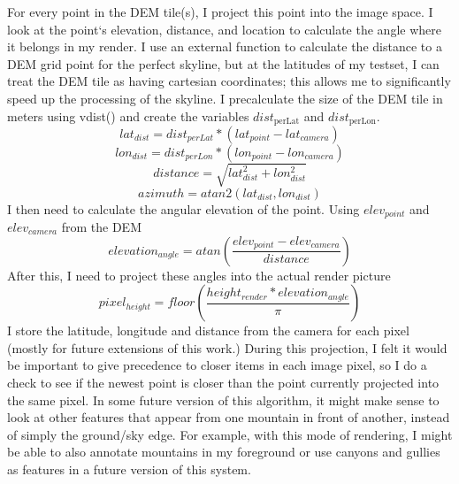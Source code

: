 \documentclass{acm_proc_article-sp}
\begin{document}
For every point in the DEM tile(s), I project this point into the image space.  I look at the point`s elevation, distance, and location to calculate the angle where it belongs in my render.  I use an external function \cite{vdist} to calculate the distance to a DEM grid point for the perfect skyline, but at the latitudes of my testset, I can treat the DEM tile as having cartesian coordinates; this allows me to significantly speed up the processing of the skyline\cite{behringer2002registration}.  I precalculate the size of the DEM tile in meters using vdist()\cite{vdist} and create the variables $dist_{\textrm{perLat}}$ and $dist_{\textrm{perLon}}$.
\begin{equation}
	lat_{dist} = dist_{perLat} * (lat_{point} - lat_{camera})
\label{eq:az1}
\end{equation}
\begin{equation}
	lon_{dist} = dist_{perLon} * (lon_{point} - lon_{camera})
\end{equation}
\begin{equation}
	distance = \sqrt{lat_{dist}^2 + lon_{dist}^2}
\end{equation}
\begin{equation}
	azimuth = atan2(lat_{dist}, lon_{dist})
\label{eq:azend}
\end{equation}
I then need to calculate the angular elevation of the point. Using $elev_{point}$ and $elev_{camera}$ from the DEM
\begin{equation}
	elevation_{angle} = atan(\frac{elev_{point} - elev_{camera}}{distance})
\end{equation}
After this, I need to project these angles into the actual render picture
\begin{equation}
	pixel_{height} = floor(\frac{height_{render} * elevation_{angle}}{\pi})
\end{equation}
I store the latitude, longitude and distance from the camera for each pixel (mostly for future extensions of this work.) During this projection, I felt it would be important to give precedence to closer items in each image pixel, so I do a check to see if the newest point is closer than the point currently projected into the same pixel.  In some future version of this algorithm, it might make sense to look at other features that appear from one mountain in front of another, instead of simply the ground/sky edge. For example, with this mode of rendering, I might be able to also annotate mountains in my foreground or use canyons and gullies as features in a future version of this system.
\end{document}
